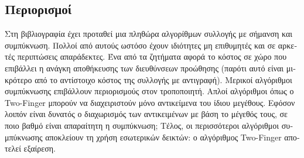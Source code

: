 \begin{greek}
\subsection{Περιορισμοί}
Στη βιβλιογραφία έχει προταθεί μια πληθώρα αλγορίθμων συλλογής
με σήμανση και συμπύκνωση. Πολλοί από αυτούς ωστόσο έχουν
ιδιότητες μη επιθυμητές και σε αρκετές περιπτώσεις απαράδεκτες.
Ένα από τα ζητήματα αφορά το κόστος σε χώρο που επιβάλλει
η ανάγκη αποθήκευσης των διευθύνσεων προώθησης (παρότι αυτό
είναι μικρότερο από το αντίστοιχο κόστος της συλλογής με
αντιγραφή). Μερικοί αλγόριθμοι συμπύκνωσης επιβάλλουν περιορισμούς
στον τροποποιητή. Απλοί αλγόριθμοι όπως ο Two-Finger μπορούν
να διαχειριστούν μόνο αντικείμενα του ίδιου μεγέθους. Εφόσον
λοιπόν είναι δυνατός ο διαχωρισμός των αντικειμένων με βάση
το μέγεθός τους, σε ποιο βαθμό είναι απαραίτητη η συμπύκνωση;
Τέλος, οι περισσότεροι αλγόριθμοι συμπύκνωσης αποκλείουν τη
χρήση εσωτερικών δεικτών: ο αλγόριθμος Two-Finger αποτελεί
εξαίρεση.
\end{greek}
